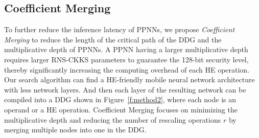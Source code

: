 \documentclass{article}
\begin{document}
	
	









\subsection{Coefficient Merging}

To further reduce the inference latency of PPNNs, we propose \textit{Coefficient Merging} to reduce the length of the critical path of the DDG and the multiplicative depth of PPNNs. A PPNN having a larger multiplicative depth requires larger RNS-CKKS parameters to guarantee the 128-bit security level, thereby significantly increasing the computing overhead of each HE operation. Our search algorithm can find a HE-friendly mobile neural network architecture with less network layers. And then each layer of the resulting network can be compiled into a DDG shown in Figure~\ref{f:method2}, where each node is an operand or a HE operation. Coefficient Merging focuses on minimizing the multiplicative depth and reducing the number of rescaling operations $r$ by merging multiple nodes into one in the DDG. 
    
\end{document}
